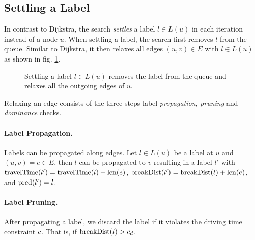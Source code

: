 \subsection{Settling a Label}
In contrast to Dijkstra, the search \emph{settles} a label $l \in L(u)$ in each iteration instead of a node $u$. When settling a label, the search first removes $l$ from the queue. Similar to Dijkstra, it then relaxes all edges $(u,v) \in E$ with $l \in L(u)$ as shown in fig. \ref{alg:settle_next_label}.

\begin{figure}[hbtp]
	\setlength{\interspacetitleruled}{0pt}%
	\setlength{\algotitleheightrule}{0pt}%
	\begin{algorithm*}[H]
		\DontPrintSemicolon


	\end{algorithm*}
	\setlength{\interspacetitleruled}{2pt}%
	\setlength{\algotitleheightrule}{\algotitleheightruledefault}%

	\caption{\label{alg:settle_next_label}Settling a label $l \in L(u)$ removes the label from the queue and relaxes all the outgoing edges of $u$.}
\end{figure}

Relaxing an edge consists of the three steps label \emph{propagation}, \emph{pruning} and \emph{dominance} checks.

\paragraph{Label Propagation.}
Labels can be propagated along edges. Let $l \in L(u)$ be a label at $u$ and $(u,v) = e \in E$, then $l$ can be propagated to $v$ resulting in a label $l'$ with $\operatorname{travelTime}(l') = \operatorname{travelTime}(l) + \operatorname{len}(e)$, $\operatorname{breakDist}(l') = \operatorname{breakDist}(l) + \operatorname{len}(e)$, and $\operatorname{pred}(l') = l$.

\paragraph{Label Pruning.}
After propagating a label, we discard the label if it violates the driving time constraint $c$. That is, if $\operatorname{breakDist}(l) > c_d$.


